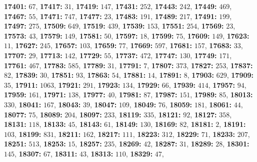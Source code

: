 \textsf{\bfseries 17401:} $67$, \textsf{\bfseries 17417:} $31$, \textsf{\bfseries 17419:} $147$, \textsf{\bfseries 17431:} $252$, \textsf{\bfseries 17443:} $242$, \textsf{\bfseries 17449:} $469$, \textsf{\bfseries 17467:} $55$, \textsf{\bfseries 17471:} $747$, \textsf{\bfseries 17477:} $23$, \textsf{\bfseries 17483:} $191$, \textsf{\bfseries 17489:} $217$, \textsf{\bfseries 17491:} $199$, \textsf{\bfseries 17497:} $275$, \textsf{\bfseries 17509:} $649$, \textsf{\bfseries 17519:} $439$, \textsf{\bfseries 17539:} $153$, \textsf{\bfseries 17551:} $254$, \textsf{\bfseries 17569:} $23$, \textsf{\bfseries 17573:} $43$, \textsf{\bfseries 17579:} $149$, \textsf{\bfseries 17581:} $50$, \textsf{\bfseries 17597:} $18$, \textsf{\bfseries 17599:} $75$, \textsf{\bfseries 17609:} $149$, \textsf{\bfseries 17623:} $11$, \textsf{\bfseries 17627:} $245$, \textsf{\bfseries 17657:} $103$, \textsf{\bfseries 17659:} $77$, \textsf{\bfseries 17669:} $597$, \textsf{\bfseries 17681:} $157$, \textsf{\bfseries 17683:} $33$, \textsf{\bfseries 17707:} $29$, \textsf{\bfseries 17713:} $142$, \textsf{\bfseries 17729:} $55$, \textsf{\bfseries 17737:} $472$, \textsf{\bfseries 17747:} $130$, \textsf{\bfseries 17749:} $171$, \textsf{\bfseries 17761:} $467$, \textsf{\bfseries 17783:} $585$, \textsf{\bfseries 17789:} $31$, \textsf{\bfseries 17791:} $7$, \textsf{\bfseries 17807:} $373$, \textsf{\bfseries 17827:} $253$, \textsf{\bfseries 17837:} $82$, \textsf{\bfseries 17839:} $30$, \textsf{\bfseries 17851:} $93$, \textsf{\bfseries 17863:} $54$, \textsf{\bfseries 17881:} $14$, \textsf{\bfseries 17891:} $8$, \textsf{\bfseries 17903:} $629$, \textsf{\bfseries 17909:} $35$, \textsf{\bfseries 17911:} $1063$, \textsf{\bfseries 17921:} $291$, \textsf{\bfseries 17923:} $134$, \textsf{\bfseries 17929:} $66$, \textsf{\bfseries 17939:} $414$, \textsf{\bfseries 17957:} $94$, \textsf{\bfseries 17959:} $161$, \textsf{\bfseries 17971:} $138$, \textsf{\bfseries 17977:} $40$, \textsf{\bfseries 17981:} $87$, \textsf{\bfseries 17987:} $151$, \textsf{\bfseries 17989:} $85$, \textsf{\bfseries 18013:} $330$, \textsf{\bfseries 18041:} $167$, \textsf{\bfseries 18043:} $39$, \textsf{\bfseries 18047:} $109$, \textsf{\bfseries 18049:} $76$, \textsf{\bfseries 18059:} $181$, \textsf{\bfseries 18061:} $44$, \textsf{\bfseries 18077:} $75$, \textsf{\bfseries 18089:} $204$, \textsf{\bfseries 18097:} $233$, \textsf{\bfseries 18119:} $335$, \textsf{\bfseries 18121:} $92$, \textsf{\bfseries 18127:} $358$, \textsf{\bfseries 18131:} $118$, \textsf{\bfseries 18133:} $45$, \textsf{\bfseries 18143:} $61$, \textsf{\bfseries 18149:} $130$, \textsf{\bfseries 18169:} $82$, \textsf{\bfseries 18181:} $2$, \textsf{\bfseries 18191:} $103$, \textsf{\bfseries 18199:} $831$, \textsf{\bfseries 18211:} $162$, \textsf{\bfseries 18217:} $111$, \textsf{\bfseries 18223:} $312$, \textsf{\bfseries 18229:} $71$, \textsf{\bfseries 18233:} $207$, \textsf{\bfseries 18251:} $513$, \textsf{\bfseries 18253:} $15$, \textsf{\bfseries 18257:} $235$, \textsf{\bfseries 18269:} $42$, \textsf{\bfseries 18287:} $31$, \textsf{\bfseries 18289:} $28$, \textsf{\bfseries 18301:} $145$, \textsf{\bfseries 18307:} $67$, \textsf{\bfseries 18311:} $43$, \textsf{\bfseries 18313:} $110$, \textsf{\bfseries 18329:} $47$, 
